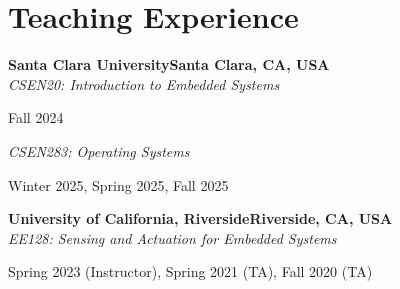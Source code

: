\documentclass[letterpaper,10pt]{article}
\newcommand{\heading}[2]{
  \hspace{10pt}#1\hfill#2\\
}
\newcommand{\headingBf}[2]{
  \heading{\textbf{#1}}{\textbf{#2}}
}
\newcommand{\headingIt}[2]{
  \heading{\textit{#1}}{\textit{#2}}
}
\newenvironment{resume_list}{
  \vspace{-7pt}
  \begin{itemize}[itemsep=-2px, parsep=1pt, leftmargin=30pt]
}{
  \end{itemize}
}
\begin{document}


  \section{Teaching Experience}

  \headingBf{Santa Clara University}{Santa Clara, CA, USA}
  \headingIt{CSEN20: Introduction to Embedded Systems}{}
  \begin{resume_list}
    \item Fall 2024
  \end{resume_list}
  \headingIt{CSEN283: Operating Systems}{}
  \begin{resume_list}
      \item Winter 2025, Spring 2025, Fall 2025
  \end{resume_list}

  \headingBf{University of California, Riverside}{Riverside, CA, USA}
  \headingIt{EE128: Sensing and Actuation for Embedded Systems}{}
  \begin{resume_list}
      \item Spring 2023 (Instructor), Spring 2021 (TA), Fall 2020 (TA)
  \end{resume_list}

\end{document}
